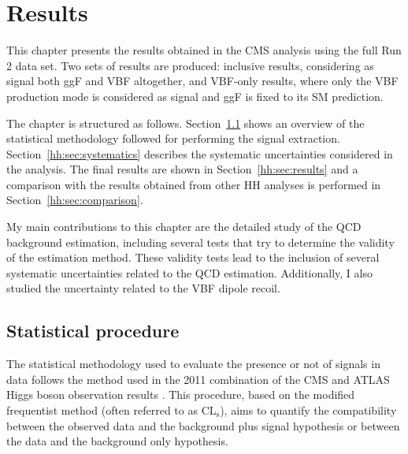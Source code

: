 \documentclass[../main.tex]{subfiles}
\begin{document}
\chapter{Results}
\label{hh:chapter:results}

This chapter presents the results obtained in the CMS \hhbbtt{} analysis using the full Run 2 data set. Two sets of results are produced: inclusive results, considering as signal both ggF and VBF altogether, and VBF-only results, where only the VBF production mode is considered as signal and ggF is fixed to its SM prediction. 

The chapter is structured as follows. Section~\ref{hh:sec:stat} shows an overview of the statistical methodology followed for performing the signal extraction. Section~\ref{hh:sec:systematics} describes the systematic uncertainties considered in the analysis. The final results are shown in Section~\ref{hh:sec:results} and a comparison with the results obtained from other HH analyses is performed in Section~\ref{hh:sec:comparison}.

My main contributions to this chapter are the detailed study of the QCD background estimation, including several tests that try to determine the validity of the estimation method. These validity tests lead to the inclusion of several systematic uncertainties related to the QCD estimation. Additionally, I also studied the uncertainty related to the VBF dipole recoil.

\section{Statistical procedure}
\label{hh:sec:stat}

The statistical methodology used to evaluate the presence or not of signals in data follows the method used in the 2011 combination of the CMS and ATLAS Higgs boson observation results \cite{hh:results:statistical_model}. This procedure, based on the modified frequentist method (often referred to as CL${}_\text{s}$), aims to quantify the compatibility between the observed data and the background plus signal hypothesis or between the data and the background only hypothesis. 
\end{document}
